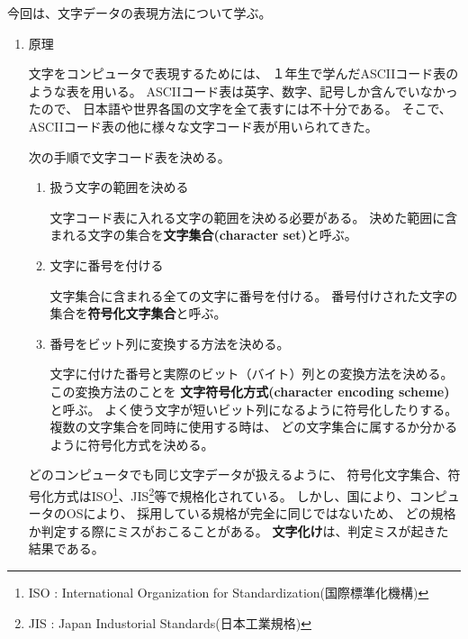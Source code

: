 \documentclass[a4j,dvipdfmx]{jarticle}
\begin{document}
\def\lstlistingname{リスト}


今回は、文字データの表現方法について学ぶ。

\begin{enumerate}

\item 原理

文字をコンピュータで表現するためには、
１年生で学んだASCIIコード表のような表を用いる。
ASCIIコード表は英字、数字、記号しか含んでいなかったので、
日本語や世界各国の文字を全て表すには不十分である。
そこで、ASCIIコード表の他に様々な文字コード表が用いられてきた。

次の手順で文字コード表を決める。

\begin{enumerate}
\item 扱う文字の範囲を決める

文字コード表に入れる文字の範囲を決める必要がある。
決めた範囲に含まれる文字の集合を{\bf 文字集合(character set)}と呼ぶ。

\item 文字に番号を付ける

文字集合に含まれる全ての文字に番号を付ける。
番号付けされた文字の集合を{\bf 符号化文字集合}と呼ぶ。

\item 番号をビット列に変換する方法を決める。

文字に付けた番号と実際のビット（バイト）列との変換方法を決める。
この変換方法のことを
{\bf 文字符号化方式(character encoding scheme)}と呼ぶ。
よく使う文字が短いビット列になるように符号化したりする。
複数の文字集合を同時に使用する時は、
どの文字集合に属するか分かるように符号化方式を決める。
\end{enumerate}

どのコンピュータでも同じ文字データが扱えるように、
符号化文字集合、符号化方式はISO\footnote{
ISO : International Organization for Standardization(国際標準化機構)
}、JIS\footnote{
JIS : Japan Industorial Standards(日本工業規格)
}等で規格化されている。
しかし、国により、コンピュータのOSにより、
採用している規格が完全に同じではないため、
どの規格か判定する際にミスがおこることがある。
{\bf 文字化け}は、判定ミスが起きた結果である。


\end{enumerate}
\end{document}
